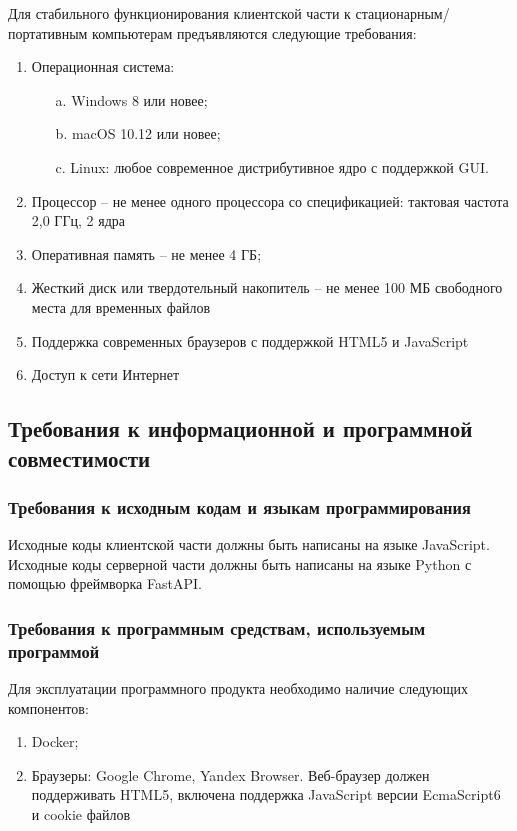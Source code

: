 \documentclass[a4paper,12pt,reqno]{article}
\begin{document}
    Для стабильного функционирования клиентской части к стационарным/портативным компьютерам предъявляются следующие требования:
    \begin{enumerate}
        \item Операционная система:
        \begin{enumerate}
            \item[a.] Windows 8 или новее;
            \item[b.] macOS 10.12 или новее;
            \item[c.] Linux: любое современное дистрибутивное ядро с поддержкой GUI.
        \end{enumerate}
        \item Процессор – не менее одного процессора со спецификацией: тактовая частота 2,0 ГГц, 2 ядра
        \item Оперативная память – не менее 4 ГБ;
        \item Жесткий диск или твердотельный накопитель – не менее 100 МБ свободного места для временных файлов
        \item Поддержка современных браузеров с поддержкой HTML5 и JavaScript
        \item Доступ к сети Интернет
    \end{enumerate}

    \subsection{Требования к информационной и программной совместимости}

    \subsubsection{Требования к исходным кодам и языкам программирования}
    Исходные коды клиентской части должны быть написаны на языке JavaScript.
    Исходные коды серверной части должны быть написаны на языке Python с помощью фреймворка FastAPI\cite{Framework:FastAPI}.

    \subsubsection{Требования к программным средствам, используемым программой}
    Для эксплуатации программного продукта необходимо наличие следующих компонентов:
    \begin{enumerate}
        \item Docker;
        \item Браузеры: Google Chrome, Yandex Browser. Веб-браузер должен поддерживать HTML5, включена поддержка JavaScript версии EcmaScript6 и cookie файлов
    \end{enumerate}
\end{document}
